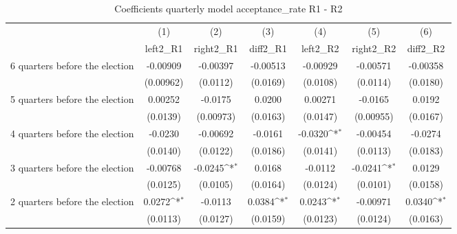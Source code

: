\begin{table}[!ht]\centering \footnotesize
\def\sym#1{\ifmmode^{#1}\else\(^{#1}\)\fi}
\caption{Coefficients quarterly model acceptance\_rate R1 - R2}
\begin{tabular}{l*{6}{c}}
\hline\hline
                    &\multicolumn{1}{c}{(1)}&\multicolumn{1}{c}{(2)}&\multicolumn{1}{c}{(3)}&\multicolumn{1}{c}{(4)}&\multicolumn{1}{c}{(5)}&\multicolumn{1}{c}{(6)}\\
                    &\multicolumn{1}{c}{left2\_R1}&\multicolumn{1}{c}{right2\_R1}&\multicolumn{1}{c}{diff2\_R1}&\multicolumn{1}{c}{left2\_R2}&\multicolumn{1}{c}{right2\_R2}&\multicolumn{1}{c}{diff2\_R2}\\
\hline
 6 quarters before the election&    -0.00909         &    -0.00397         &    -0.00513         &    -0.00929         &    -0.00571         &    -0.00358         \\
                    &   (0.00962)         &    (0.0112)         &    (0.0169)         &    (0.0108)         &    (0.0114)         &    (0.0180)         \\
[1em]
 5 quarters before the election&     0.00252         &     -0.0175         &      0.0200         &     0.00271         &     -0.0165         &      0.0192         \\
                    &    (0.0139)         &   (0.00973)         &    (0.0163)         &    (0.0147)         &   (0.00955)         &    (0.0167)         \\
[1em]
 4 quarters before the election&     -0.0230         &    -0.00692         &     -0.0161         &     -0.0320\sym{*}  &    -0.00454         &     -0.0274         \\
                    &    (0.0140)         &    (0.0122)         &    (0.0186)         &    (0.0141)         &    (0.0113)         &    (0.0183)         \\
[1em]
 3 quarters before the election&    -0.00768         &     -0.0245\sym{*}  &      0.0168         &     -0.0112         &     -0.0241\sym{*}  &      0.0129         \\
                    &    (0.0125)         &    (0.0105)         &    (0.0164)         &    (0.0124)         &    (0.0101)         &    (0.0158)         \\
[1em]
 2 quarters before the election&      0.0272\sym{*}  &     -0.0113         &      0.0384\sym{*}  &      0.0243\sym{*}  &    -0.00971         &      0.0340\sym{*}  \\
                    &    (0.0113)         &    (0.0127)         &    (0.0159)         &    (0.0123)         &    (0.0124)         &    (0.0163)         \\

\end{tabular}
\end{table}
